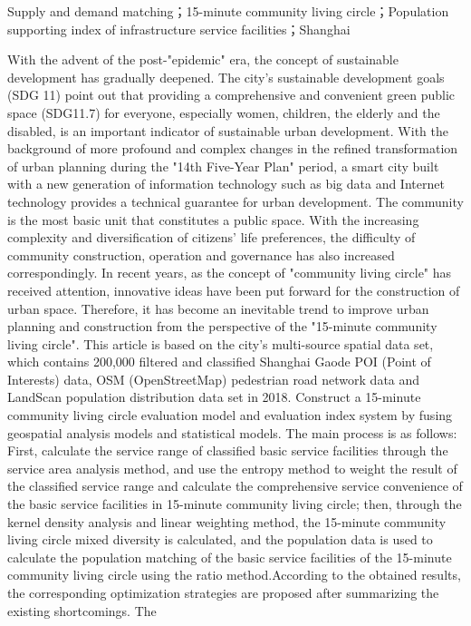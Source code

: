 \documentclass{shnuthesis}
\begin{document}

\begin{enabstract}{Supply and demand matching；15-minute community living circle；Population supporting index of infrastructure service facilities；Shanghai}
	
With the advent of the post-"epidemic" era, the concept of sustainable development has gradually deepened. The city’s sustainable development goals (SDG 11) point out that providing a comprehensive and convenient green public space (SDG11.7) for everyone, especially women, children, the elderly and the disabled, is an important indicator of sustainable urban development. With the background of more profound and complex changes in the refined transformation of urban planning during the "14th Five-Year Plan" period, a smart city built with a new generation of information technology such as big data and Internet technology provides a technical guarantee for urban development. The community is the most basic unit that constitutes a public space. With the increasing complexity and diversification of citizens' life preferences, the difficulty of community construction, operation and governance has also increased correspondingly. In recent years, as the concept of "community living circle" has received attention, innovative ideas have been put forward for the construction of urban space. Therefore, it has become an inevitable trend to improve urban planning and construction from the perspective of the "15-minute community living circle". This article is based on the city's multi-source spatial data set, which contains 200,000 filtered and classified Shanghai Gaode POI (Point of Interests) data, OSM (OpenStreetMap) pedestrian road network data and LandScan population distribution data set in 2018. Construct a 15-minute community living circle evaluation model and evaluation index system by fusing geospatial analysis models and statistical models. The main process is as follows: First, calculate the service range of classified basic service facilities through the service area analysis method, and use the entropy method to weight the result of the classified service range and calculate the comprehensive service convenience of the basic service facilities in 15-minute community living circle; then, through the kernel density analysis and linear weighting method, the 15-minute community living circle mixed diversity is calculated, and the population data is used to calculate the population matching of the basic service facilities of the 15-minute community living circle using the ratio method.According to the obtained results, the corresponding optimization strategies are proposed after summarizing the existing shortcomings. The 
\end{enabstract}
\end{document}
